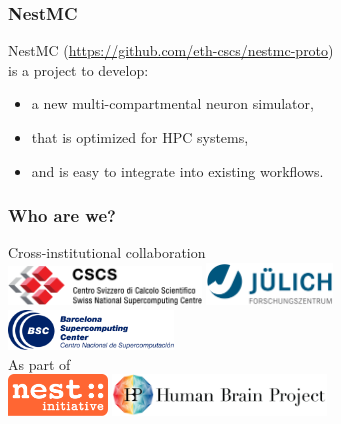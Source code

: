 \documentclass[aspectratio=43,12pt]{beamer}
\author{Alexander Peyser, FZ-J \& Sam Yates, CSCS}
\title{\nestmc}
\subtitle{A new multi-compartment neuron simulator}
\date{\today}
\newcommand{\nestmc}{NestMC}
\begin{document}
\cscstitle

\begin{frame}
\frametitle{\nestmc}
\vfill
\nestmc{} (\url{https://github.com/eth-cscs/nestmc-proto})\\ is a project to develop:

\begin{itemize}
\item a new \textcolor{cscsblue}{multi-compartmental} neuron simulator,
\item that is optimized for HPC systems,
\item and is easy to integrate into existing workflows.
\end{itemize}
\vfill

\end{frame}

\begin{frame}
\frametitle{Who are we?}
\centering 
\vspace{1ex}
{\large Cross-institutional collaboration}\\[2ex]
\includegraphics[height=2.8em]{logos/cscs_logo.pdf}
\hspace{15mm}
\includegraphics[height=3em]{logos/julich_logo.pdf}
\hspace*{5mm}
\\[1.4em]
\includegraphics[height=2.9em]{logos/bsc_logo.pdf}\\

\vfill
{\large As part of}\\[2ex]
\includegraphics[height=3em]{logos/nest-initiative.pdf}
\hspace{15mm}
\includegraphics[height=3em]{logos/HBP_logo.jpg}

\vspace*{1em}
\end{frame}
\end{document}
